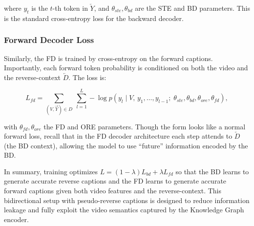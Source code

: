 where $y_t$ is the $t$-th token in $\overleftarrow{Y}$, and $\theta_{ste},\theta_{bd}$ are the STE and BD parameters. This is the standard cross-entropy loss for the backward decoder.

\subsubsection{Forward Decoder Loss}

Similarly, the FD is trained by cross-entropy on the forward captions. Importantly, each forward token probability is conditioned on both the video and the reverse-context $\overleftarrow{D}$. The loss is:

$$
L_{fd} = \sum_{(V,\overrightarrow{Y})\in D}\;\sum_{l=1}^L -\log p(y_l \mid V,\,y_1,\dots,y_{l-1};\;\theta_{ste},\theta_{bd},\theta_{ore},\theta_{fd}),
$$

with $\theta_{fd},\theta_{ore}$ the FD and ORE parameters. Though the form looks like a normal forward loss, recall that in the FD decoder architecture each step attends to $\overleftarrow{D}$ (the BD context), allowing the model to use ``future'' information encoded by the BD.

In summary, training optimizes $L = (1-\lambda)L_{bd} + \lambda L_{fd}$ so that the BD learns to generate accurate reverse captions and the FD learns to generate accurate forward captions given both video features and the reverse-context. This bidirectional setup with pseudo-reverse captions is designed to reduce information leakage and fully exploit the video semantics captured by the Knowledge Graph encoder.